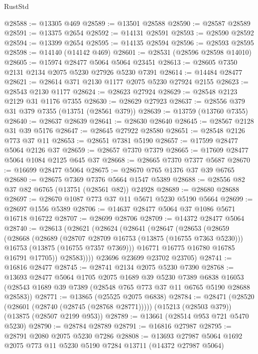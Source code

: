 \begin{lexlean}{RustStd}
\begin{coremodule}
@28588 := @13305 @469
@28589 := @13501 @28588
@28590 := @28587 @28589
@28591 := @13375 @2654
@28592 := @14131 @28591
@28593 := @28590 @28592
@28594 := @13399 @2654
@28595 := @14135 @28594
@28596 := @28593 @28595
@28598 := @14140 (@14142 @469)
@28601 := @28531 (@28596 @28598 @14010)
@28605 := @15974 @28477 @5064 @5064 @23451
@28613 := @28605 @7350 @2131 @2134 @2075 @5230 @27926 @5230 @7391
@28614 := @14484 @28477
@28621 := @28614 @371 @2130 @1177 @2075 @5230 @27924 @2155
@28623 := @28543 @2130 @1177
@28624 := @28623 @27924
@28629 := @28548 @2123 @2129 @31 @1176 @7355
@28630 := @28629 @27923
@28637 := @28556 @379 @31 @379 @7355 (@13751 (@28561 @379))
@28639 := @13759 (@13760 @7355)
@28640 := @28637 @28639
@28641 := @28630 @28640
@28645 := @28567 @2128 @31 @39 @5176
@28647 := @28645 @27922 @28580
@28651 := @28548 @2126 @773 @37 @11
@28653 := @28651 @7381 @5190
@28657 := @17599 @28477 @5064 @2126 @37
@28659 := @28657 @7370 @7379
@28665 := @17609 @28477 @5064 @1084 @2125 @645 @37
@28668 := @28665 @7370 @7377 @5687
@28670 := @16699 @28477 @5064
@28675 := @28670 @765 @1376 @37 @39 @6765
@28680 := @28675 @7369 @7376 @5664 @1547 @5389
@28688 := @28556 @82 @37 @82 @6765 (@13751 (@28561 @82)) @24928
@28689 := @28680 @28688
@28697 := @28670 @1087 @773 @37 @11 @5671 @5230 @5190 @5664
@28699 := @28697 @1556 @5389
@28706 := @14637 @28477 @5064 @37 @1086 @5671 @16718 @16722
@28707 := @28699 @28706
@28709 := @14372 @28477 @5064
@28740 := @28613
    (@28621
      (@28624
        (@28641
          (@28647
            (@28653
              (@28659
                (@28668
                  (@28689
                    (@28707 @28709 @16753 (@13875 (@16755 @7363 @5230)))
                    @16753
                    (@13875 (@16755 @7357 @7369)))
                  @16771
                  @16775
                  @16780
                  @16785
                  @16791
                  @17705))
              @28583))))
      @23696
      @23699
      @23702
      @23705)
@28741 := @16816 @28477
@28745 := @28741 @2134 @2075 @5230 @7390
@28768 := @13693
    @28477
    @5064
    @1705
    @2075
    @1689
    @39
    @5230
    @7389
    @6838
    @16053
    (@28543 @1689 @39 @7389 (@28548 @765 @773 @37 @11 @6765 @5190 @28688 @28583))
@28771 := @13865 (@25525 @2075 @6838)
@28784 := @28471
    (@28520 (@28601 (@28740 (@28745 (@28768 @28771)))))
    (@15213 (@28503 @379))
    (@13875 (@28507 @2199 @953))
@28789 := @13661 (@28514 @953 @721 @5470 @5230)
@28790 := @28784 @28789
@28791 := @16816 @27987
@28795 := @28791 @2080 @2075 @5230 @7286
@28808 := @13693 @27987 @5064 @1692 @2075 @773 @11 @5230 @5190 @7284 @13711 (@14372 @27987 @5064)

\end{coremodule}
\end{lexlean}
